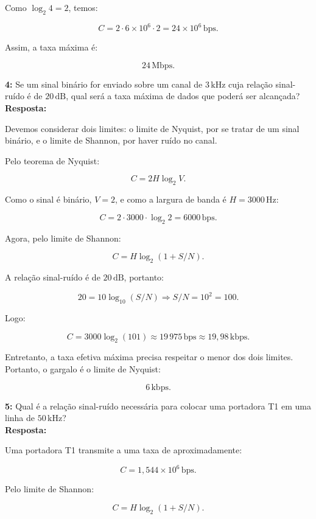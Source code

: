 \documentclass[12pt,a4paper]{report}
\begin{document}
Como $\log_2 4 = 2$, temos:

\[
C = 2 \cdot 6 \times 10^6 \cdot 2 = 24 \times 10^6\,\text{bps}.
\]

Assim, a taxa máxima é:

\[
\boxed{24\,\text{Mbps}}.
\]


\vspace{0.6cm}

\noindent \textbf{4:} Se um sinal binário for enviado sobre um canal de $3\,\text{kHz}$ cuja relação sinal-ruído é de $20\,\text{dB}$, qual será a taxa máxima de dados que poderá ser alcançada?\\
\textbf{Resposta:}

Devemos considerar dois limites: o limite de Nyquist, por se tratar de um sinal binário, e o limite de Shannon, por haver ruído no canal.

Pelo teorema de Nyquist:

\[
C = 2H\log_2 V.
\]

Como o sinal é binário, $V=2$, e como a largura de banda é $H=3000\,\text{Hz}$:

\[
C = 2 \cdot 3000 \cdot \log_2 2 = 6000\,\text{bps}.
\]

Agora, pelo limite de Shannon:

\[
C = H\log_2(1+S/N).
\]

A relação sinal-ruído é de $20\,\text{dB}$, portanto:

\[
20 = 10\log_{10}(S/N) \Rightarrow S/N = 10^2 = 100.
\]

Logo:

\[
C = 3000\log_2(101) \approx 19\,975\,\text{bps} \approx 19{,}98\,\text{kbps}.
\]

Entretanto, a taxa efetiva máxima precisa respeitar o menor dos dois limites. Portanto, o gargalo é o limite de Nyquist:

\[
\boxed{6\,\text{kbps}}.
\]


\vspace{0.6cm}

\noindent \textbf{5:} Qual é a relação sinal-ruído necessária para colocar uma portadora T1 em uma linha de $50\,\text{kHz}$?\\
\textbf{Resposta:}

Uma portadora T1 transmite a uma taxa de aproximadamente:

\[
C = 1{,}544 \times 10^6\,\text{bps}.
\]

Pelo limite de Shannon:

\[
C = H\log_2(1+S/N).
\]
\end{document}
